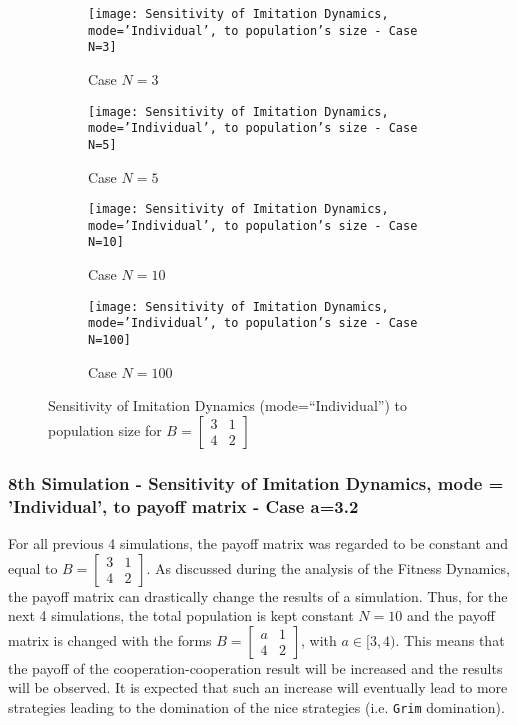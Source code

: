 	\begin{figure}[h]
		\centering
		\begin{subfigure}[t]{.49\textwidth}
			\centering
			\texttt{[image: Sensitivity of Imitation Dynamics, mode='Individual', to population's size - Case N=3]}
			\caption{Case $N=3$}
			\label{fig:example18}
		\end{subfigure}
		\begin{subfigure}[t]{.49\textwidth}
			\centering
			\texttt{[image: Sensitivity of Imitation Dynamics, mode='Individual', to population's size - Case N=5]}
			\caption{Case $N=5$}
			\label{fig:example19}
		\end{subfigure}
		\par\vspace{1em}
		\begin{subfigure}[t]{.49\textwidth}
			\centering
			\texttt{[image: Sensitivity of Imitation Dynamics, mode='Individual', to population's size - Case N=10]}
			\caption{Case $N=10$}
			\label{fig:example20}
		\end{subfigure}
		\begin{subfigure}[t]{.49\textwidth}
			\centering
			\texttt{[image: Sensitivity of Imitation Dynamics, mode='Individual', to population's size - Case N=100]}
			\caption{Case $N=100$}
			\label{fig:example21}
		\end{subfigure}
		\caption{Sensitivity of Imitation Dynamics (mode=``Individual'') to population size for $B = \begin{bmatrix} 3 & 1 \\ 4 & 2 \end{bmatrix}$}
		\label{fig:Sensitivity of Imitation Dynamics, mode='Individual', to population's size}
	\end{figure}
	
\subsubsection{8th Simulation - Sensitivity of Imitation Dynamics, mode = 'Individual', to payoff matrix - Case a=3.2}
For all previous 4 simulations, the payoff matrix was regarded to be constant and equal to $B = \begin{bmatrix} 3 & 1 \\ 4 & 2 \end{bmatrix}$. As discussed during the analysis of the Fitness Dynamics, the payoff matrix can drastically change the results of a simulation. Thus, for the next 4 simulations, the total population is kept constant $N=10$ and the payoff matrix is changed with the forms $B = \begin{bmatrix} a & 1 \\ 4 & 2 \end{bmatrix}$, with $a \in [3,4)$. This means that the payoff of the cooperation-cooperation result will be increased and the results will be observed. It is expected that such an increase will eventually lead to more strategies leading to the domination of the nice strategies (i.e. \texttt{Grim} domination). 

